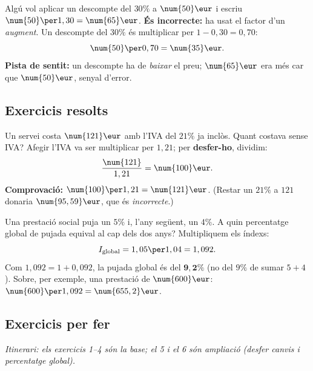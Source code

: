 \begin{exemple}
Algú vol aplicar un descompte del $30\%$ a $\num{50}\eur$ i escriu
$\num{50}\per 1,30=\num{65}\eur$. \textbf{És incorrecte:} ha usat el factor d'un
\emph{augment}. Un descompte del $30\%$ és multiplicar per $1-0,30=0,70$:
\[
\num{50}\per 0,70=\num{35}\eur.
\]
\textbf{Pista de sentit:} un descompte ha de \emph{baixar} el preu; $\num{65}\eur$ era
més car que $\num{50}\eur$, senyal d'error.
\end{exemple}

\subsection{Exercicis resolts}

\begin{exresolt}
Un servei costa $\num{121}\eur$ amb l'IVA del $21\%$ ja inclòs. Quant costava sense
IVA?
\solucio
Afegir l'IVA va ser multiplicar per $1,21$; per \textbf{desfer-ho}, dividim:
\[
\frac{\num{121}}{1,21}=\num{100}\eur.
\]
\textbf{Comprovació:} $\num{100}\per 1,21=\num{121}\eur$. (Restar un $21\%$ a
$\num{121}$ donaria $\num{95,59}\eur$, que és \emph{incorrecte}.)
\end{exresolt}

\begin{exresolt}
Una prestació social puja un $5\%$ i, l'any següent, un $4\%$. A quin percentatge
global de pujada equival al cap dels dos anys?
\solucio
Multipliquem els índexs:
\[
I_{\text{global}}=1,05\per 1,04=1,092.
\]
Com $1,092=1+0,092$, la pujada global és del $\mathbf{9,2\%}$ (no del $9\%$ de sumar
$5+4$). Sobre, per exemple, una prestació de $\num{600}\eur$:
$\num{600}\per 1,092=\num{655,2}\eur$.
\end{exresolt}

\subsection{Exercicis per fer}

\noindent\textit{Itinerari: els exercicis 1–4 són la base; el 5 i el 6 són ampliació
(desfer canvis i percentatge global).}

